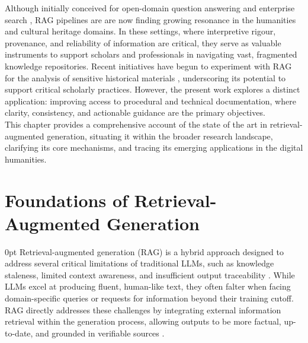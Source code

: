 \begin{spacing}{1.5}
Although initially conceived for open-domain question answering and enterprise search \parencite{akkiraju_facts_2024, jiang_towards_2024, packowski_optimizing_2024, yang_ragva_2025, zhou_enabling_2025}, RAG pipelines are are now finding growing resonance in the humanities and cultural heritage domains. In these settings, where interpretive rigour, provenance, and reliability of information are critical, they serve as valuable instruments to support scholars and professionals in navigating vast, fragmented knowledge repositories. Recent initiatives have begun to experiment with RAG for the analysis of sensitive historical materials \citep{callaghan_prototyping_2025, ciletti_retrieval-augmented_2025, sergeev_talking_2025, fan_research_2025}, underscoring its potential to support critical scholarly practices. However, the present work explores a distinct application: improving access to procedural and technical documentation, where clarity, consistency, and actionable guidance are the primary objectives.
\\

This chapter provides a comprehensive account of the state of the art in retrieval-augmented generation, situating it within the broader research landscape, clarifying its core mechanisms, and tracing its emerging applications in the digital humanities.

\section{Foundations of Retrieval-Augmented Generation}\setlength{\parskip}
{0pt}
Retrieval-augmented generation (RAG) is a hybrid approach designed to address several critical limitations of traditional LLMs, such as knowledge staleness, limited context awareness, and insufficient output traceability \parencite{vaibhav_retrieval-augmented_2025,gao_retrieval-augmented_2024, gupta_comprehensive_2024}. While LLMs excel at producing fluent, human-like text, they often falter when facing domain-specific queries or requests for information beyond their training cutoff. RAG directly addresses these challenges by integrating external information retrieval within the generation process, allowing outputs to be more factual, up-to-date, and grounded in verifiable sources \citep{wang_searching_2024}.


\end{spacing}
